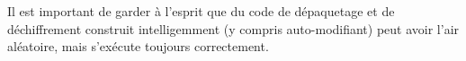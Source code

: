 









Il est important de garder à l'esprit que du code de dépaquetage et de déchiffrement
construit intelligemment (y compris auto-modifiant) peut avoir l'air aléatoire, mais
s'exécute toujours correctement.

